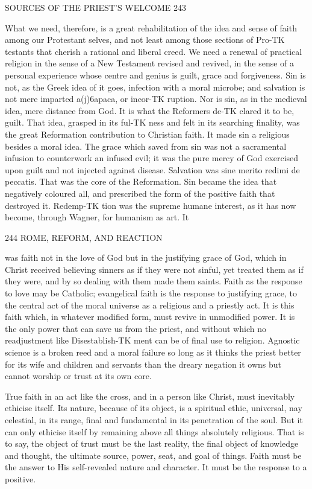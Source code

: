 \documentclass[12pt,a5paper,twoside]{book}
\begin{document}
{SOURCES OF THE PRIEST'S WELCOME 243 



What we need, therefore, is a great rehabilitation 
of the idea and sense of faith among our Protestant 
selves, and not least among those sections of Pro-TK
testants that cherish a rational and liberal creed. We 
need a renewal of practical religion in the sense of a 
New Testament revised and revived, in the sense of 
a personal experience whose centre and genius is 
guilt, grace and forgiveness. Sin is not, as the Greek 
idea of it goes, infection with a moral microbe; and 
salvation is not mere imparted a(j)6apaca, or incor-TK
ruption. Nor is sin, as in the medieval idea, mere 
distance from God. It is what the Reformers de-TK
clared it to be, guilt. That idea, grasped in its ful-TK
ness and felt in its searching finality, was the great 
Reformation contribution to Christian faith. It made 
sin a religious besides a moral idea. The grace which 
saved from sin was not a sacramental infusion to 
counterwork an infused evil; it was the pure mercy 
of God exercised upon guilt and not injected against 
disease. Salvation was sine merito redimi de peccatis. 
That was the core of the Reformation. Sin became 
the idea that negatively coloured all, and prescribed the 
form of the positive faith that destroyed it. Redemp-TK
tion was the supreme humane interest, as it has now 
become, through Wagner, for humanism as art. It 



244 ROME, REFORM, AND REACTION 

was faith not in the love of God but in the justifying 
grace of God, which in Christ received believing 
sinners as if they were not sinful, yet treated them as 
if they were, and by so dealing with them made them 
saints. Faith as the response to love may be Catholic; 
evangelical faith is the response to justifying grace, 
to the central act of the moral universe as a religious 
and a priestly act. It is this faith which, in whatever 
modified form, must revive in unmodified power. It 
is the only power that can save us from the priest, 
and without which no readjustment like Disestablish-TK
ment can be of final use to religion. Agnostic 
science is a broken reed and a moral failure so long as 
it thinks the priest better for its wife and children 
and servants than the dreary negation it owns but 
cannot worship or trust at its own core. 

True faith in an act like the cross, and in a person 
like Christ, must inevitably ethicise itself. Its nature, 
because of its object, is a spiritual ethic, universal, 
nay celestial, in its range, final and fundamental in its 
penetration of the soul. But it can only ethicise itself 
by remaining above all things absolutely religious. 
That is to say, the object of trust must be the last 
reality, the final object of knowledge and thought, 
the ultimate source, power, seat, and goal of things. 
Faith must be the answer to His self-revealed nature 
and character. It must be the response to a positive. 



}
\end{document}
